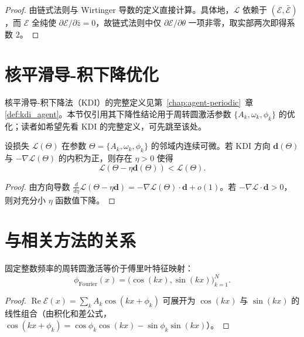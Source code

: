 \begin{proof}
由链式法则与 Wirtinger 导数的定义直接计算。具体地，$\mathcal L$ 依赖于 $(\mathcal E, \bar{\mathcal E})$，而 $\mathcal E$ 全纯使 $\partial\mathcal E/\partial\bar z=0$，故链式法则中仅 $\partial\mathcal E/\partial\theta$ 一项非零，取实部两次即得系数 $2$。
\end{proof}

\section{核平滑导-积下降优化}

\begin{remark}\label{rem:kdi-interface}
核平滑导-积下降法（KDI）的完整定义见第~\ref{chap:agent-periodic}~章 \cref{def:kdi_agent}。本节仅引用其下降性结论用于周转圆激活参数 $\{A_k,\omega_k,\phi_k\}$ 的优化；读者如希望先看 KDI 的完整定义，可先跳至该处。
\end{remark}

\begin{proposition}\label{prop:kdi-epicycle-descent}
设损失 $\mathcal L(\Theta)$ 在参数 $\Theta=\{A_k,\omega_k,\phi_k\}$ 的邻域内连续可微。若 KDI 方向 $\mathbf d(\Theta)$ 与 $-\nabla\mathcal L(\Theta)$ 的内积为正，则存在 $\eta>0$ 使得
\[
\mathcal L(\Theta-\eta\mathbf d(\Theta))<\mathcal L(\Theta).
\]
\end{proposition}

\begin{proof}
由方向导数 $\frac{d}{d\eta}\mathcal L(\Theta-\eta\mathbf d)=-\nabla\mathcal L(\Theta)\cdot\mathbf d+o(1)$。若 $-\nabla\mathcal L\cdot\mathbf d>0$，则对充分小 $\eta$ 函数值下降。
\end{proof}

\section{与相关方法的关系}

\begin{proposition}[与傅里叶特征的关系]\label{prop:fourier-features}
固定整数频率的周转圆激活等价于傅里叶特征映射：
\[
\phi_{\mathrm{Fourier}}(x)=\bigl(\cos(kx),\sin(kx)\bigr)_{k=1}^{N}.
\]
\end{proposition}

\begin{proof}
$\operatorname{Re}\mathcal E(x)=\sum_k A_k\cos(kx+\phi_k)$ 可展开为 $\cos(kx)$ 与 $\sin(kx)$ 的线性组合（由积化和差公式，$\cos(kx+\phi_k)=\cos\phi_k\cos(kx)-\sin\phi_k\sin(kx)$）。
\end{proof}

